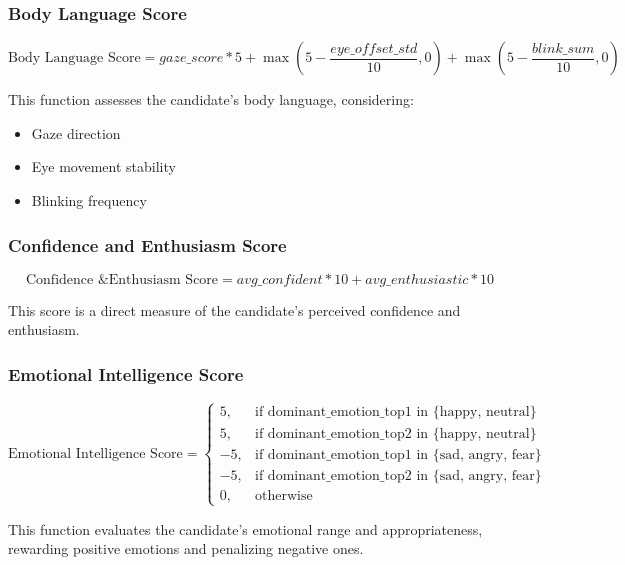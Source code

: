 \documentclass{article}
\begin{document}
\subsubsection{Body Language Score}
\begin{equation}
    \text{Body Language Score} = gaze\_score * 5 + \max(5 - \frac{eye\_offset\_std}{10}, 0) + \max(5 - \frac{blink\_sum}{10}, 0)
\end{equation}

This function assesses the candidate's body language, considering:
\begin{itemize}
    \item Gaze direction
    \item Eye movement stability
    \item Blinking frequency
\end{itemize}

\subsubsection{Confidence and Enthusiasm Score}
\begin{equation}
    \text{Confidence \& Enthusiasm Score} = avg\_confident * 10 + avg\_enthusiastic * 10
\end{equation}

This score is a direct measure of the candidate's perceived confidence and enthusiasm.

\subsubsection{Emotional Intelligence Score}
\begin{equation}
    \text{Emotional Intelligence Score} = \begin{cases}
        5, & \text{if dominant\_emotion\_top1 in \{happy, neutral\}} \\
        5, & \text{if dominant\_emotion\_top2 in \{happy, neutral\}} \\
        -5, & \text{if dominant\_emotion\_top1 in \{sad, angry, fear\}} \\
        -5, & \text{if dominant\_emotion\_top2 in \{sad, angry, fear\}} \\
        0, & \text{otherwise}
    \end{cases}
\end{equation}

This function evaluates the candidate's emotional range and appropriateness, rewarding positive emotions and penalizing negative ones.
\end{document}
